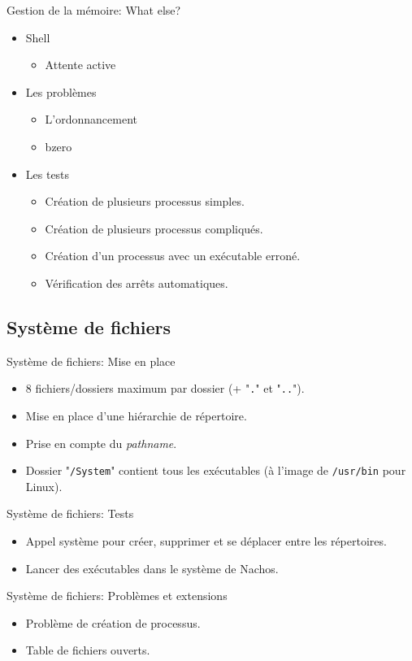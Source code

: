\documentclass{beamer}
\begin{document}
\begin{frame}{Gestion de la mémoire: What else?}
    \begin{itemize}
        \item Shell
        \begin{itemize}
 			\item Attente active
 		\end{itemize}
        \item Les problèmes
        \begin{itemize}
 		\item L'ordonnancement
 		\item bzero
  		\end{itemize}
        \item Les tests
        \begin{itemize}
 		\item Création de plusieurs processus simples.
 		\item Création de plusieurs processus compliqués.
 		\item Création d'un processus avec un exécutable erroné.
 		\item Vérification des arrêts automatiques.
  		\end{itemize}
    \end{itemize}
\end{frame}

\subsection{Système de fichiers}

\begin{frame}{Système de fichiers: Mise en place }
    \begin{itemize}
		\item 8 fichiers/dossiers maximum par dossier (+ "\texttt{.}" et "\texttt{..}").
		\item Mise en place d'une hiérarchie de répertoire.
		\item Prise en compte du \emph{pathname}.
		\item Dossier "\texttt{/System}" contient tous les exécutables (à l'image de \texttt{/usr/bin} pour Linux).
    \end{itemize}
\end{frame}
\begin{frame}{Système de fichiers: Tests }
    \begin{itemize}
		\item Appel système pour créer, supprimer et se déplacer entre les répertoires.
		\item Lancer des exécutables dans le système de Nachos.
		
    \end{itemize}
\end{frame}
\begin{frame}{Système de fichiers: Problèmes et extensions }
    \begin{itemize}
		\item Problème de création de processus. 
		\item Table de fichiers ouverts.
		
    \end{itemize}
\end{frame}
\end{document}
